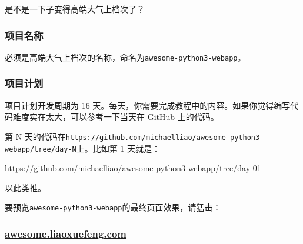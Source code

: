 是不是一下子变得高端大气上档次了？

\hypertarget{ux9879ux76eeux540dux79f0}{%
\subsubsection{项目名称}\label{ux9879ux76eeux540dux79f0}}

必须是高端大气上档次的名称，命名为\texttt{awesome-python3-webapp}。

\hypertarget{ux9879ux76eeux8ba1ux5212}{%
\subsubsection{项目计划}\label{ux9879ux76eeux8ba1ux5212}}

项目计划开发周期为 16
天。每天，你需要完成教程中的内容。如果你觉得编写代码难度实在太大，可以参考一下当天在
GitHub 上的代码。

第 N
天的代码在\texttt{https://github.com/michaelliao/awesome-python3-webapp/tree/day-N}上。比如第
1 天就是：

\url{https://github.com/michaelliao/awesome-python3-webapp/tree/day-01}

以此类推。

要预览\texttt{awesome-python3-webapp}的最终页面效果，请猛击：

\hypertarget{awesome.liaoxuefeng.com}{%
\subsubsection{\texorpdfstring{\href{http://awesome.liaoxuefeng.com/}{awesome.liaoxuefeng.com}}{awesome.liaoxuefeng.com}}\label{awesome.liaoxuefeng.com}}

